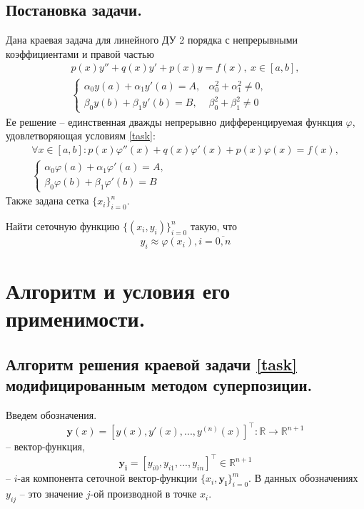 \documentclass[a4paper, 12pt]{article}
\begin{document}
	\subsection{Постановка задачи.}
	
	Дана краевая задача для линейного ДУ 2 порядка с непрерывными коэффициентами и правой частью
	\begin{equation} \label{task}
		\begin{gathered}
			p(x)y''+q(x)y'+p(x)y=f(x),\ x\in[a,b],\\
			\begin{cases}
				\alpha_0y(a)+\alpha_1y'(a)=A, &\alpha_0^2+\alpha_1^2\neq0,\\
				\beta_0y(b)+\beta_1y'(b)=B, &\beta_0^2+\beta_1^2\neq0
			\end{cases}
		\end{gathered}
	\end{equation}
	Ее решение -- единственная дважды непрерывно дифференцируемая функция $\varphi$, удовлетворяющая условиям \eqref{task}:
	\begin{equation}
		\begin{gathered}
			\forall x\in[a,b]: p(x)\varphi''(x)+q(x)\varphi'(x)+p(x)\varphi(x)=f(x),\\ 
			\begin{cases}
				\alpha_0\varphi(a)+\alpha_1\varphi'(a)=A,\\
				\beta_0\varphi(b)+\beta_1\varphi'(b)=B
			\end{cases}
		\end{gathered}
	\end{equation}
	Также задана сетка $\{x_i\}_{i=0}^n$.
	
	Найти сеточную функцию $\{(x_i,y_i)\}_{i=0}^n$ такую, что
	\begin{equation}
		y_i\approx\varphi(x_i), i=\overline{0,n}
	\end{equation}
	
	\section{Алгоритм и условия его применимости.}
	
	\subsection{Алгоритм решения краевой задачи \eqref{task} модифицированным методом суперпозиции.}
	\label{alghorithm_simple}
	
	Введем обозначения. 
	\begin{equation}
		\mathbf{y}(x)=[y(x),y'(x),...,y^{(n)}(x)]^\top : \mathbb{R}\rightarrow\mathbb{R}^{n+1}
	\end{equation}
	-- вектор-функция,
	\begin{equation}
		\mathbf{y_i}=[y_{i0},y_{i1},...,y_{in}]^\top\in \mathbb{R}^{n+1}
	\end{equation}
	-- $i$-ая компонента сеточной вектор-функции $\{x_i, \mathbf{y_i}\}_{i=0}^m$. В данных обозначениях $y_{ij}$ -- это значение $j$-ой производной в точке $x_i$.
	
\end{document}
